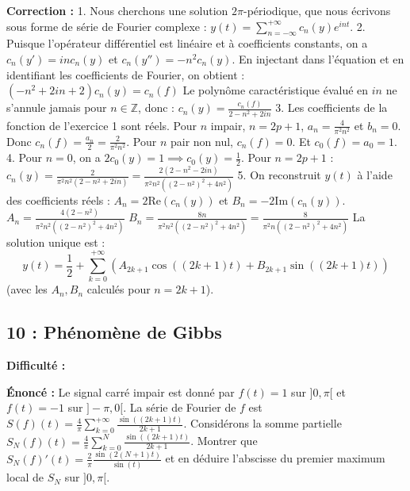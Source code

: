 \documentclass[12pt,a4paper]{article}
\begin{document}
\textbf{Correction :}
1. Nous cherchons une solution $2\pi$-périodique, que nous écrivons sous forme de série de Fourier complexe : $y(t) = \sum_{n=-\infty}^{+\infty} c_n(y) e^{int}$.
2. Puisque l'opérateur différentiel est linéaire et à coefficients constants, on a $c_n(y') = in c_n(y)$ et $c_n(y'') = -n^2 c_n(y)$.
   En injectant dans l'équation et en identifiant les coefficients de Fourier, on obtient :
   $(-n^2 + 2in + 2) c_n(y) = c_n(f)$
   Le polynôme caractéristique évalué en $in$ ne s'annule jamais pour $n \in \mathbb{Z}$, donc :
   $c_n(y) = \frac{c_n(f)}{2 - n^2 + 2in}$
3. Les coefficients de la fonction de l'exercice 1 sont réels. Pour $n$ impair, $n = 2p+1$, $a_n = \frac{4}{\pi^2 n^2}$ et $b_n = 0$. Donc $c_n(f) = \frac{a_n}{2} = \frac{2}{\pi^2 n^2}$. Pour $n$ pair non nul, $c_n(f) = 0$. Et $c_0(f) = a_0 = 1$.
4. Pour $n=0$, on a $2 c_0(y) = 1 \implies c_0(y) = \frac{1}{2}$.
   Pour $n = 2p+1$ :
   $c_n(y) = \frac{2}{\pi^2 n^2 (2 - n^2 + 2in)} = \frac{2(2 - n^2 - 2in)}{\pi^2 n^2 ((2 - n^2)^2 + 4n^2)}$
5. On reconstruit $y(t)$ à l'aide des coefficients réels : $A_n = 2 \text{Re}(c_n(y))$ et $B_n = -2 \text{Im}(c_n(y))$.
   $A_n = \frac{4(2 - n^2)}{\pi^2 n^2 ((2-n^2)^2 + 4n^2)}$
   $B_n = \frac{8n}{\pi^2 n^2 ((2-n^2)^2 + 4n^2)} = \frac{8}{\pi^2 n ((2-n^2)^2 + 4n^2)}$
   La solution unique est :
   $$y(t) = \frac{1}{2} + \sum_{k=0}^{+\infty} \left( A_{2k+1} \cos((2k+1)t) + B_{2k+1} \sin((2k+1)t) \right)$$
   (avec les $A_n, B_n$ calculés pour $n=2k+1$).


\subsection*{10 : Phénomène de Gibbs}

\textbf{Difficulté :} \bigstar\bigstar\bigstar\bigstar\bigstar

\textbf{Énoncé :}
Le signal carré impair est donné par $f(t) = 1$ sur $]0, \pi[$ et $f(t) = -1$ sur $]-\pi, 0[$. La série de Fourier de $f$ est $S(f)(t) = \frac{4}{\pi} \sum_{k=0}^{+\infty} \frac{\sin((2k+1)t)}{2k+1}$.
Considérons la somme partielle $S_N(f)(t) = \frac{4}{\pi} \sum_{k=0}^N \frac{\sin((2k+1)t)}{2k+1}$.
Montrer que $S_N(f)'(t) = \frac{2}{\pi} \frac{\sin(2(N+1)t)}{\sin(t)}$ et en déduire l'abscisse du premier maximum local de $S_N$ sur $]0, \pi[$.
\end{document}

